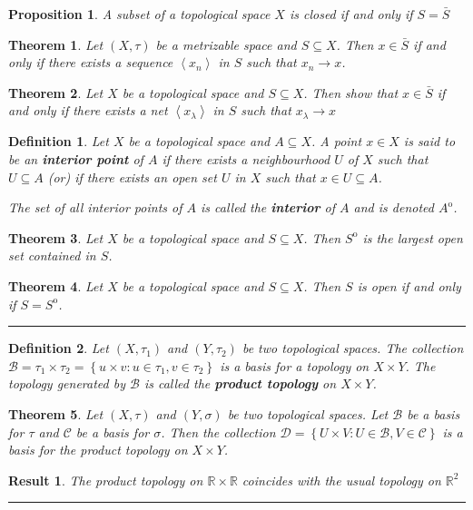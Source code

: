 \documentclass[14pt,twoside]{extreport}
\newcommand{\hhrule}{\vspace{1cm}\hrule\vspace{1cm}}
\newtheorem*{defn}{Definition}
\newtheorem*{thm}{Theorem}
\newtheorem*{result}{Result}
\newtheorem*{prop}{Proposition}
\begin{document}
\begin{prop}
    A subset of a topological space $X$ is closed if and only if $S = \bar{S}$
\end{prop}

\begin{thm}
    Let $\left (X, \tau\right )$ be a metrizable space and $S \subseteq X$. Then $x \in \bar{S}$ if and only if there exists a sequence $\left\langle x_n\right\rangle $ in $S$ such that $x_n \to x$.
\end{thm}

\begin{thm}
    Let $X$ be a topological space and $S \subseteq X$. Then show that $x \in \bar{S}$ if and only if there exists a net $\left\langle  x_\lambda \right\rangle $ in $S$ such that $ x_\lambda \to x$
\end{thm}

\begin{defn}
        Let $X$ be a topological space and $A \subseteq X$. A point $x \in X$ is said to be an \textbf{interior point} of $A$ if there exists a neighbourhood $U$ of $X$ such that $U \subseteq A$ (or) if there exists an open set $U$ in $X$ such that $x \in U \subseteq A$.

        The set of all interior points of $A$ is called the \textbf{interior} of $A$ and is denoted $A ^\mathrm{o}$.
\end{defn}

\begin{thm}
    Let $X$ be a topological space and $S \subseteq X$. Then $S ^\mathrm{o}$ is the largest open set contained in $S$.
\end{thm}

\begin{thm}
    Let $X$ be a topological space and $S \subseteq X$. Then $S$ is open if and only if $S = S ^\mathrm{o}$.
\end{thm}

\hhrule 

\begin{defn}
    Let $\left (X, \tau_1\right )$ and $\left (Y, \tau_2\right )$ be two topological spaces. The collection $\mathcal{B} = \tau_1 \times \tau_2 = \left\{ u \times v  :  u \in \tau_1, v \in \tau_2 \right\}$ is a basis for a topology on $X \times Y$.
    The topology generated by $\mathcal{B}$ is called the \textbf{product topology} on $X \times Y$.
\end{defn}

\begin{thm}
    Let $\left (X, \tau\right )$ and $\left (Y, \sigma\right )$ be two topological spaces. Let $\mathcal{B}$ be a basis for $\tau$ and $\mathcal{C}$ be a basis for $\sigma$.
    Then the collection $\mathcal{D} = \left\{ U \times V  :  U \in \mathcal{B}, V \in \mathcal{C} \right\}$ is a basis for the product topology on $X \times Y$.
\end{thm}

\begin{result}
    The product topology on $\mathbb{R} \times \mathbb{R}$ coincides with the usual topology on $\mathbb{R}^2$
\end{result}

\hhrule
\end{document}
